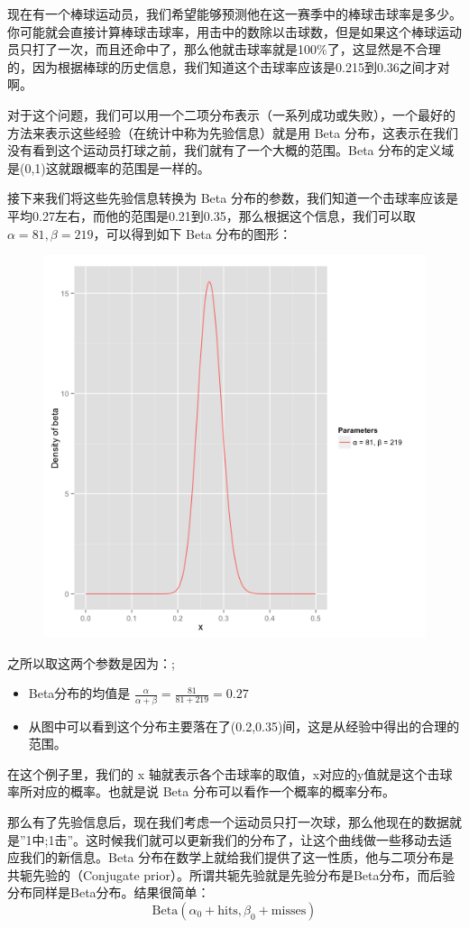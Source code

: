 \documentclass[12pt]{article}
\begin{document}
现在有一个棒球运动员，我们希望能够预测他在这一赛季中的棒球击球率是多少。你可能就会直接计算棒球击球率，用击中的数除以击球数，但是如果这个棒球运动员只打了一次，而且还命中了，那么他就击球率就是100\%了，这显然是不合理的，因为根据棒球的历史信息，我们知道这个击球率应该是0.215到0.36之间才对啊。

对于这个问题，我们可以用一个二项分布表示（一系列成功或失败），一个最好的方法来表示这些经验（在统计中称为先验信息）就是用 Beta 分布，这表示在我们没有看到这个运动员打球之前，我们就有了一个大概的范围。Beta 分布的定义域是(0,1)这就跟概率的范围是一样的。

接下来我们将这些先验信息转换为 Beta 分布的参数，我们知道一个击球率应该是平均0.27左右，而他的范围是0.21到0.35，那么根据这个信息，我们可以取$\alpha=81, \beta=219$，可以得到如下 Beta 分布的图形：
\begin{figure}[H]
  \centering
  \includegraphics[width=.5\textwidth]{fig/Beta_Distribution_Example_1.png} 
\end{figure}

之所以取这两个参数是因为：;
\begin{itemize}
    \item Beta分布的均值是 $\frac{\alpha}{\alpha+\beta} = \frac{81}{81+219} = 0.27$
    \item 从图中可以看到这个分布主要落在了(0.2,0.35)间，这是从经验中得出的合理的范围。
\end{itemize}

在这个例子里，我们的 x 轴就表示各个击球率的取值，x对应的y值就是这个击球率所对应的概率。也就是说 Beta 分布可以看作一个概率的概率分布。

那么有了先验信息后，现在我们考虑一个运动员只打一次球，那么他现在的数据就是”1中;1击”。这时候我们就可以更新我们的分布了，让这个曲线做一些移动去适应我们的新信息。Beta 分布在数学上就给我们提供了这一性质，他与二项分布是共轭先验的（Conjugate prior）。所谓共轭先验就是先验分布是Beta分布，而后验分布同样是Beta分布。结果很简单：
$$
\text{Beta}(\alpha_0 + \text{hits}, \beta_0 + \text{misses})
$$
\end{document}
